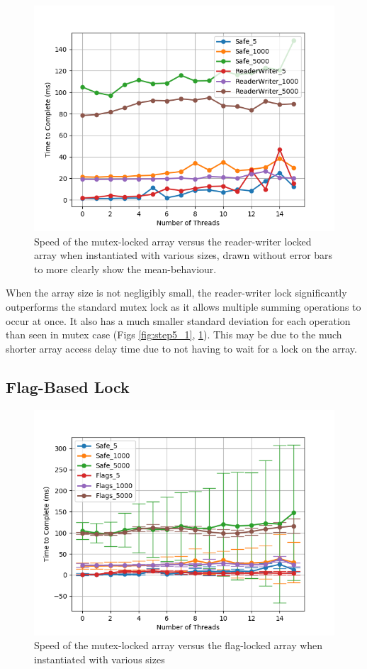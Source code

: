 \documentclass[11pt]{article}
\begin{document}
\begin{figure}\label{fig:step5_2}
\centering
\includegraphics[scale=0.65]{step5_2.png}
\caption{Speed of the mutex-locked array versus the reader-writer locked array when instantiated with various sizes, drawn without error bars to more clearly show the mean-behaviour.}
\end{figure}

When the array size is not negligibly small, the reader-writer lock significantly outperforms the standard mutex lock as it allows multiple summing operations to occur at once. It also has a much smaller standard deviation for each operation than seen in mutex case (Figs \ref{fig:step5_1}, \ref{fig:step5_2}). This may be due to the much shorter array access delay time due to not having to wait for a lock on the array.

\subsection{Flag-Based Lock}

\begin{figure}\label{fig:step6_1}
\centering
\includegraphics[scale=0.65]{step6_1.png}
\caption{Speed of the mutex-locked array versus the flag-locked array when instantiated with various sizes}
\end{figure}
\end{document}
